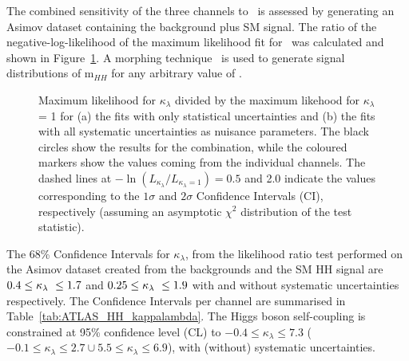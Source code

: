 The combined sensitivity of the three channels to \kl\ is assessed by generating an Asimov dataset containing the background plus SM signal. The ratio of the negative-log-likelihood of the maximum likelihood fit for \kl\ was calculated and shown in Figure~\ref{fig:ATLAS_HH_comb}. A morphing technique~\cite{ATL-PHYS-PUB-2015-047} is used to generate signal distributions of m$_{HH}$ for any arbitrary value of \kl.

\begin{figure}[!htb]
\centering 
{} 
\caption{Maximum likelihood for $\kappa_{\lambda}$ divided by the maximum likehood for $\kappa_{\lambda}$ = 1 for (a) the fits with only statistical uncertainties and (b) the fits with all systematic uncertainties as nuisance parameters. The black circles show the results for the combination, while the coloured markers show the values coming from the individual channels. The dashed lines at $-\ln\left(L_{\kappa_{\lambda}}/L_{\kappa_{\lambda}=1}\right) = 0.5$ and 2.0 indicate the values corresponding to the $1\sigma$ and $2\sigma$ Confidence Intervals (CI), respectively (assuming an asymptotic $\chi^2$ distribution of the test statistic).} 
\label{fig:ATLAS_HH_comb} 
\end{figure}

The 68\% Confidence Intervals for $\kappa_{\lambda}$, from the likelihood ratio test performed on the Asimov dataset created from the backgrounds and the SM HH signal are $0.4 \leq \kappa_{\lambda}\ \leq 1.7$ and $0.25 \leq \kappa_{\lambda}\ \leq 1.9$ with and without systematic uncertainties respectively. The Confidence Intervals per channel are summarised in Table~\ref{tab:ATLAS_HH_kappalambda}. 
The Higgs boson self-coupling is constrained at 95\% confidence level (CL) to $-0.4\leq \kappa_{\lambda} \leq7.3$ ($-0.1\leq \kappa_{\lambda} \leq2.7\cup5.5\leq \kappa_{\lambda} \leq6.9$), with (without) systematic uncertainties.


